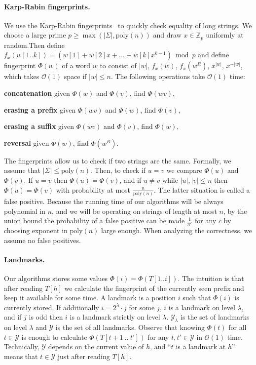 \documentclass{article}[11pt,letter]
\newcommand{\bigo}{\mathcal{O}}
\newcommand{\head}{h}
\newcommand{\hash}{\Phi}
\newcommand{\poly}{\text{poly}}
\newcommand{\bhash}{\hash}
\newcommand{\level}{\lambda}
\newenvironment{mydesc}[1]{\begin{list}{}{\settowidth{\labelwidth}{#1}
    \setlength{\labelsep}{0.5cm}
    \setlength{\leftmargin}{\labelwidth}
    \addtolength{\leftmargin}{\labelsep}
    \setlength{\rightmargin}{0pt}
    \setlength{\parsep}{0.5ex plus0.2ex minus0.1ex}
    \setlength{\itemsep}{0ex plus0.2ex}
    }
  }
{\end{list}}
\begin{document}
\paragraph{Karp-Rabin fingerprints.} We use the Karp-Rabin fingerprints~\cite{KR} to quickly check equality of long strings. We choose a large prime $p\geq \max(|\Sigma|,\poly(n))$
and draw $x\in \mathbb{Z}_{p}$ uniformly at random.Then define $f_x(w[1..k]) = (w[1] + w[2] x + \ldots + w[k] x^{k-1}) \bmod p$
and define fingerprint $\hash(w)$ of a word $w$ to consist of $|w|$, $f_x(w)$, $f_{x}(w^R)$, $x^{|w|}$, $x^{-|w|}$,
which takes $\bigo(1)$ space if $|w|\leq n$.
The following operations take $\bigo(1)$ time:
\begin{mydesc}{\bf erasing a suffix}
\item[\bf concatenation] given $\hash(w)$ and $\hash(v)$, find $\hash(wv)$,
\item[\bf erasing a prefix] given $\hash(wv)$ and $\hash(w)$, find $\hash(v)$,
\item[\bf erasing a suffix] given $\hash(wv)$ and $\hash(v)$, find $\hash(w)$,
\item[\bf reversal] given $\hash(w)$, find $\hash(w^R)$.
\end{mydesc}

The fingerprints allow us to check if two strings are the same. Formally, we assume that $|\Sigma|\leq\poly(n)$. Then,
to check if $u=v$ we compare $\hash(u)$ and $\hash(v)$.
If $u=v$ then $\hash(u)=\hash(v)$, and if $u\neq v$ while $|u|,|v|\leq n$ then $\hash(u)=\hash(v)$ with probability at most $\frac{n}{\poly(n)}$.
The latter situation is called a false positive. Because the running time of our algorithms will be always polynomial in $n$, and we will
be operating on strings of length at most $n$, by the union bound the probability of a false positive can be made $\frac{1}{n^{c}}$
for any $c$ by choosing exponent in $\poly(n)$ large enough. When analyzing the correctness, we assume no false positives.

\paragraph{Landmarks.} Our algorithms stores some values $\bhash(i)=\hash(T[1..i])$.
The intuition is that after reading $T[\head]$ we calculate
the fingerprint of the currently seen prefix and keep it available for some time.
A landmark is a position $i$ such that $\bhash(i)$ is currently stored.
If additionally $i=2^{\level}\cdot j$ for some $j$, $i$ is a landmark on
level $\level$, and if $j$ is odd then $i$ is a landmark strictly on level
$\level$. $\mathcal{Y}_\level$ is the set of landmarks on level $\level$
and $\mathcal{Y}$ is the set of all landmarks. Observe that knowing
$\bhash(t)$ for all $t\in\mathcal{Y}$ is enough to calculate
$\hash(T[t+1\ ..\ t'])$ for any $t,t' \in \mathcal{Y}$ in $\bigo(1)$ time.
Technically, $\mathcal{Y}$ depends on the current value of $\head$, and
``$t$ is a landmark at $h$'' means that $t\in\mathcal{Y}$ just after reading $T[\head]$.
\end{document}
